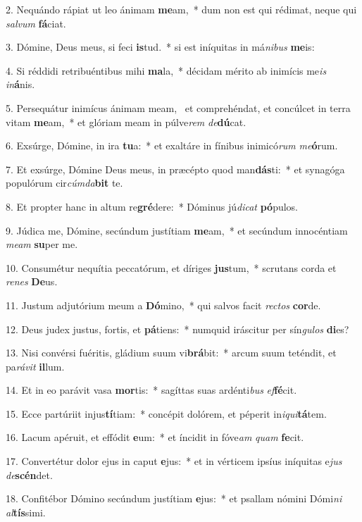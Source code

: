 2. Nequándo rápiat ut leo ánimam \textbf{me}am,~*  dum non est qui rédimat, neque qui \textit{sal}\textit{vum} \textbf{fá}ciat.\

3. Dómine, Deus meus, si feci \textbf{is}tud.~*  si est iníquitas in má\textit{ni}\textit{bus} \textbf{me}is:\

4. Si réddidi retribuéntibus mihi \textbf{ma}la,~*  décidam mérito ab inimícis me\textit{is} \textit{in}\textbf{á}nis.\

5. Persequátur inimícus ánimam meam, \dag\  et comprehéndat, et concúlcet in terra vitam \textbf{me}am,~*  et glóriam meam in púlve\textit{rem} \textit{de}\textbf{dú}cat.\

6. Exsúrge, Dómine, in ira \textbf{tu}a:~*  et exaltáre in fínibus inimicó\textit{rum} \textit{me}\textbf{ó}rum.\

7. Et exsúrge, Dómine Deus meus, in præcépto quod man\textbf{dás}ti:~*  et synagóga populórum cir\textit{cúm}\textit{da}\textbf{bit} te.\

8. Et propter hanc in altum re\textbf{gré}dere:~*  Dóminus jú\textit{di}\textit{cat} \textbf{pó}pulos.\

9. Júdica me, Dómine, secúndum justítiam \textbf{me}am,~*  et secúndum innocéntiam \textit{me}\textit{am} \textbf{su}per me.\

10. Consumétur nequítia peccatórum, et díriges \textbf{jus}tum,~*  scrutans corda et \textit{re}\textit{nes} \textbf{De}us.\

11. Justum adjutórium meum a \textbf{Dó}mino,~*  qui salvos facit \textit{rec}\textit{tos} \textbf{cor}de.\

12. Deus judex justus, fortis, et \textbf{pá}tiens:~*  numquid iráscitur per sín\textit{gu}\textit{los} \textbf{di}es?\

13. Nisi convérsi fuéritis, gládium suum vi\textbf{brá}bit:~*  arcum suum teténdit, et pa\textit{rá}\textit{vit} \textbf{il}lum.\

14. Et in eo parávit vasa \textbf{mor}tis:~*  sagíttas suas ardénti\textit{bus} \textit{ef}\textbf{fé}cit.\

15. Ecce partúriit injus\textbf{tí}tiam:~*  concépit dolórem, et péperit in\textit{i}\textit{qui}\textbf{tá}tem.\

16. Lacum apéruit, et effódit \textbf{e}um:~*  et íncidit in fóve\textit{am} \textit{quam} \textbf{fe}cit.\

17. Convertétur dolor ejus in caput \textbf{e}jus:~*  et in vérticem ipsíus iníquitas e\textit{jus} \textit{de}\textbf{scén}det.\

18. Confitébor Dómino secúndum justítiam \textbf{e}jus:~*  et psallam nómini Dómi\textit{ni} \textit{al}\textbf{tís}simi.\

